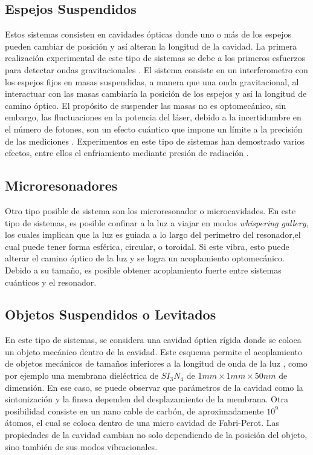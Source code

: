 \documentclass[a4paper,10pt]{report}
\begin{document}
\subsection{Espejos Suspendidos}

Estos sistemas consisten en cavidades ópticas donde uno o más de los espejos pueden cambiar de posición y así alteran la longitud de la cavidad. La primera realización experimental de este tipo de sistemas se debe a los primeros esfuerzos para detectar ondas gravitacionales \cite{AbramoviciLIGO}. El sistema consiste en un interferometro con los espejos fijos en masas suspendidas, a manera que una onda gravitacional, al interactuar con las masas cambiaría la posición de los espejos y así la longitud de camino óptico. El propósito de suspender las masas no es optomecánico, sin embargo, las fluctuaciones en la potencia del láser, debido a la incertidumbre en el número de fotones, son un efecto cuántico que impone un límite a la precisión de las mediciones \cite{CavesIF}. Experimentos en este tipo de sistemas han demostrado varios efectos, entre ellos el enfriamiento mediante presión de radiación \cite{CorbittOC}.

\subsection{Microresonadores}

Otro tipo posible de sistema son los microresonador o microcavidades. En este tipo de sistemas, es posible confinar a la luz a viajar en modos \textit{whispering gallery}, los cuales implican que la luz es guiada a lo largo del perímetro del resonador,el cual puede tener forma esférica, circular, o toroidal\cite{VahalaOM}. Si este vibra, esto puede alterar el camino óptico de la luz y se logra un acoplamiento optomecánico. Debido a su tamaño, es posible obtener acoplamiento fuerte entre sistemas cuánticos y el resonador\cite{VerhagenMOC}.

\subsection{Objetos Suspendidos o Levitados}

En este tipo de sistemas, se considera una cavidad óptica rígida donde se coloca un objeto mecánico dentro de la cavidad. Este esquema permite el acoplamiento de objetos mecánicos de tamaños inferiores a la longitud de onda de la luz \cite{KippenberCO}, como por ejemplo una membrana dieléctrica de $SI_3N_4$ de  $1mm \times 1mm \times 50nm$
de dimensión\cite{SankeyMC}. En ese caso, se puede observar que parámetros de la cavidad como la sintonización y la finesa dependen del desplazamiento de la membrana. Otra posibilidad consiste en un nano cable de carbón, de aproximadamente $10^9$ átomos, el cual se coloca dentro de una micro cavidad de Fabri-Perot. Las propiedades de la cavidad cambian no solo dependiendo de la posición del objeto, sino también de sus modos vibracionales\cite{FaveroCR}.  
\end{document}
